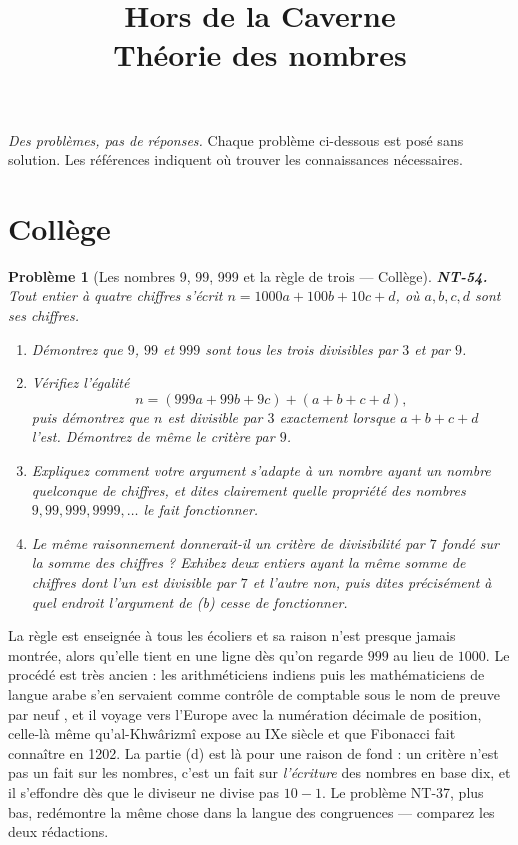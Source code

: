 \documentclass[11pt]{article}
\title{Hors de la Caverne \\ \Large Théorie des nombres}
\author{}
\date{}
\newtheorem{problem}{Problème}
\begin{document}
\maketitle
\noindent\emph{Des problèmes, pas de réponses.} Chaque problème ci-dessous est posé
sans solution. Les références indiquent où trouver les connaissances nécessaires.
\medskip


\section*{Collège}

\begin{problem}[{Les nombres 9, 99, 999 et la règle de trois --- Collège}]
\textbf{NT-54.} Tout entier à quatre chiffres s'écrit $ n = 1000a + 100b + 10c + d $, où
$ a, b, c, d $ sont ses chiffres.
\begin{enumerate}
\item[(a)] Démontrez que $ 9 $, $ 99 $ et $ 999 $ sont tous les trois divisibles par $ 3 $ et par
$ 9 $.
\item[(b)] Vérifiez l'égalité
\[ n = (999a + 99b + 9c) + (a + b + c + d) , \]
puis démontrez que $ n $ est divisible par $ 3 $ exactement lorsque $ a + b + c + d $ l'est.
Démontrez de même le critère par $ 9 $.
\item[(c)] Expliquez comment votre argument s'adapte à un nombre ayant un nombre quelconque de chiffres, et
dites clairement quelle propriété des nombres $ 9, 99, 999, 9999, \ldots $ le fait fonctionner.
\item[(d)] Le même raisonnement donnerait-il un critère de divisibilité par $ 7 $ fondé sur la somme des
chiffres ? Exhibez deux entiers ayant la même somme de chiffres dont l'un est divisible par $ 7 $ et
l'autre non, puis dites précisément à quel endroit l'argument de (b) cesse de fonctionner.
\end{enumerate}

\end{problem}

\noindent La règle est enseignée à tous les écoliers et sa raison n'est presque jamais
montrée, alors qu'elle tient en une ligne dès qu'on regarde $ 999 $ au lieu de $ 1000 $. Le
procédé est très ancien : les arithméticiens indiens puis les mathématiciens de langue arabe s'en
servaient comme contrôle de comptable sous le nom de \og{} preuve par neuf \fg{}, et il voyage vers l'Europe
avec la numération décimale de position, celle-là même qu'al-Khwârizmî expose au IXe siècle
et que Fibonacci fait connaître en 1202. La partie (d) est là pour une raison de fond : un critère
n'est pas un fait sur les nombres, c'est un fait sur \textit{l'écriture} des nombres en base dix, et il
s'effondre dès que le diviseur ne divise pas $ 10 - 1 $. Le problème NT-37, plus bas, redémontre la
même chose dans la langue des congruences --- comparez les deux rédactions.
\end{document}
